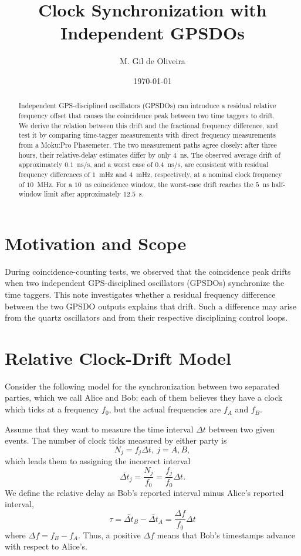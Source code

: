 \documentclass[a4paper,10pt]{article}
\title{Clock Synchronization with Independent GPSDOs}
\author{M. Gil de Oliveira}
\date{\today}
\begin{document}
\maketitle

\begin{abstract}
Independent GPS-disciplined oscillators (GPSDOs) can introduce a residual relative frequency offset that causes the coincidence peak between two time taggers to drift. We derive the relation between this drift and the fractional frequency difference, and test it by comparing time-tagger measurements with direct frequency measurements from a Moku:Pro Phasemeter. The two measurement paths agree closely: after three hours, their relative-delay estimates differ by only $4$~ns. The observed average drift of approximately $0.1$~ns/s, and a worst case of $0.4$~ns/s, are consistent with residual frequency differences of $1$~mHz and $4$~mHz, respectively, at a nominal clock frequency of $10$~MHz. For a $10$~ns coincidence window, the worst-case drift reaches the $5$~ns half-window limit after approximately $12.5$~s.
\end{abstract}

\section{Motivation and Scope}

During coincidence-counting tests, we observed that the coincidence peak drifts when two independent GPS-disciplined oscillators (GPSDOs) synchronize the time taggers. This note investigates whether a residual frequency difference between the two GPSDO outputs explains that drift. Such a difference may arise from the quartz oscillators and from their respective disciplining control loops.

\section{Relative Clock-Drift Model}

Consider the following model for the synchronization between two separated parties, which we call Alice and Bob: each of them believes they have a clock which ticks at a frequency $f_0$, but the actual frequencies are $f_A$ and $f_B$.

Assume that they want to measure the time interval $\Delta t$ between two given events. The number of clock ticks measured by either party is
\begin{equation}
    N_j = f_j \Delta t, \ j=A,B,
\end{equation}
which leads them to assigning the incorrect interval
\begin{equation}
    \overline{\Delta t}_j = \frac{N_j}{f_0} = \frac{f_j}{f_0} \Delta t.
\end{equation}
We define the relative delay as Bob's reported interval minus Alice's reported interval,
\begin{equation}
    \tau = \overline{\Delta t}_B - \overline{\Delta t}_A = \frac{\Delta f}{f_0} \Delta t
\end{equation}
where $\Delta f = f_B - f_A$. Thus, a positive $\Delta f$ means that Bob's timestamps advance with respect to Alice's.
\end{document}
